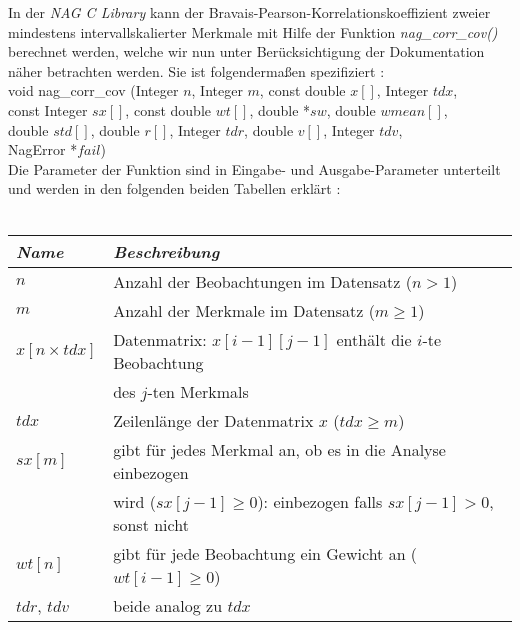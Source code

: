 In der {\it NAG C Library} kann der Bravais-Pearson-Korrelationskoeffizient zweier mindestens intervallskalierter Merkmale mit Hilfe der Funktion {\it nag\_corr\_cov()} berechnet werden, welche wir nun unter Berücksichtigung der Dokumentation \cite{nag:g02bxc} näher betrachten werden. Sie ist folgendermaßen spezifiziert \cite[S. 1]{nag:g02bxc}:\\

\noindent void nag\_corr\_cov (Integer $n$, Integer $m$, const double $x[]$, Integer $tdx$,\\
\hspace*{5mm} const Integer $sx[]$, const double $wt[]$, double *$sw$, double $wmean[]$,\\
\hspace*{5mm} double $std[]$, double $r[]$, Integer $tdr$, double $v[]$, Integer $tdv$,\\
\hspace*{5mm} NagError *$fail$)\\

\noindent Die Parameter der Funktion sind in Eingabe- und Ausgabe-Parameter unterteilt und werden in den folgenden beiden Tabellen erklärt \cite[S. 2-3]{nag:g02bxc}:\\

\\

\noindent \begin{tabular}[ht]{|l|l|}
  	\hline
  	\textit{Name} & \textit{Beschreibung}\\
  	\hline \hline
  	$n$ & Anzahl der Beobachtungen im Datensatz ($n > 1$)\\ \hline
  	$m$ & Anzahl der Merkmale im Datensatz ($m \geq 1$)\\ \hline
	$x[n \times tdx]$ & Datenmatrix: $x[i - 1][j - 1]$ enthält die $i$-te Beobachtung\\
	& des $j$-ten Merkmals\\ \hline
	$tdx$ & Zeilenlänge der Datenmatrix $x$ ($tdx \geq m$)\\ \hline
	$sx[m]$ & gibt für jedes Merkmal an, ob es in die Analyse einbezogen\\
	& wird ($sx[j-1] \geq 0$): einbezogen falls $sx[j-1] > 0$, sonst nicht\\ \hline
	$wt[n]$ & gibt für jede Beobachtung ein Gewicht an ($wt[i-1] \geq 0$)\\ \hline
	$tdr$, $tdv$ & beide analog zu $tdx$\\
	\hline
\end{tabular}\\\\


